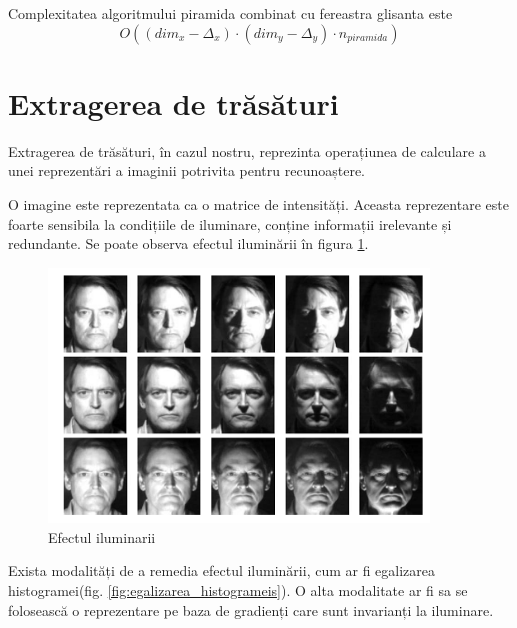 Complexitatea algoritmului piramida combinat cu fereastra glisanta este 
$${O((dim_x-\Delta_x) \cdot (dim_y-\Delta_y) \cdot n_{piramida})}$$

\pagebreak
\section{Extragerea de trăsături}

Extragerea de trăsături, în cazul nostru, reprezinta operațiunea de calculare a unei reprezentări a imaginii potrivita pentru recunoaștere.

O imagine este reprezentata ca o matrice de intensități.
Aceasta reprezentare este foarte sensibila la condițiile de iluminare, conține informații irelevante și redundante.
Se poate observa efectul iluminării în figura \ref{fig:efectul_iluminarii}.

\begin{figure}[H]
	\centering
		\includegraphics[width=0.90\textwidth]{imagini/efectul_iluminarii.png}
	\caption{Efectul iluminarii\footnotemark}
	\label{fig:efectul_iluminarii}
\end{figure}


Exista modalități de a remedia efectul iluminării, cum ar fi egalizarea histogramei(fig. \ref{fig:egalizarea_histogrameis}).
O alta modalitate ar fi sa se folosească o reprezentare pe baza de gradienți care sunt invarianți la iluminare.

